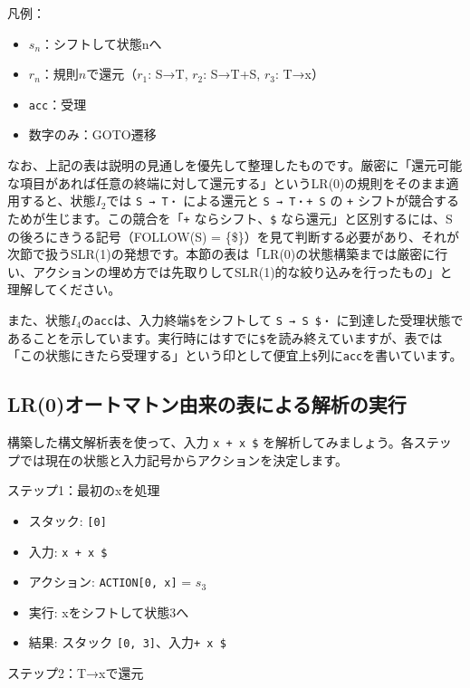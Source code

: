 凡例：

\begin{itemize}
\item
  \(s_n\)：シフトして状態nへ
\item
  \(r_n\)：規則\(n\)で還元（\(r_1\): S→T, \(r_2\): S→T+S, \(r_3\): T→x）
\item
  \texttt{acc}：受理
\item
  数字のみ：GOTO遷移
\end{itemize}

なお、上記の表は説明の見通しを優先して整理したものです。厳密に「還元可能な項目があれば任意の終端に対して還元する」というLR(0)の規則をそのまま適用すると、状態\(I_2\)では
\texttt{S\ →\ T・} による還元と \texttt{S\ →\ T・+\ S} の \texttt{+}
シフトが競合するためが生じます。この競合を「\texttt{+}
ならシフト、\texttt{\$}
なら還元」と区別するには、Sの後ろにきうる記号（FOLLOW(S) =
\{\$\}）を見て判断する必要があり、それが次節で扱うSLR(1)の発想です。本節の表は「LR(0)の状態構築までは厳密に行い、アクションの埋め方では先取りしてSLR(1)的な絞り込みを行ったもの」と理解してください。

また、状態\(I_4\)の\texttt{acc}は、入力終端\texttt{\$}をシフトして
\texttt{S\textquotesingle{}\ →\ S\ \$・}
に到達した受理状態であることを示しています。実行時にはすでに\texttt{\$}を読み終えていますが、表では「この状態にきたら受理する」という印として便宜上\texttt{\$}列に\texttt{acc}を書いています。

\subsection{LR(0)オートマトン由来の表による解析の実行}

構築した構文解析表を使って、入力 \texttt{x\ +\ x\ \$}
を解析してみましょう。各ステップでは現在の状態と入力記号からアクションを決定します。

ステップ1：最初のxを処理

\begin{itemize}
\item
  スタック: \texttt{{[}0{]}}
\item
  入力: \texttt{x\ +\ x\ \$}
\item
  アクション: \texttt{ACTION{[}0,\ x{]}} = \(s_3\)
\item
  実行: xをシフトして状態3へ
\item
  結果: スタック \texttt{{[}0,\ 3{]}}、入力\texttt{+ x \$}
\end{itemize}

ステップ2：T→xで還元

